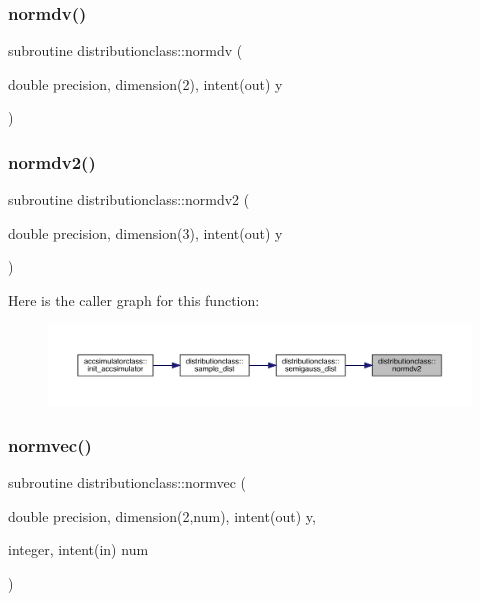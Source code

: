 \subsubsection{\texorpdfstring{normdv()}{normdv()}}
{\footnotesize\ttfamily subroutine distributionclass\+::normdv (\begin{DoxyParamCaption}\item[{double precision, dimension(2), intent(out)}]{y }\end{DoxyParamCaption})}

\mbox{\label{namespacedistributionclass_a020961b4717af242fc3c82090a17ce12}} 
\subsubsection{\texorpdfstring{normdv2()}{normdv2()}}
{\footnotesize\ttfamily subroutine distributionclass\+::normdv2 (\begin{DoxyParamCaption}\item[{double precision, dimension(3), intent(out)}]{y }\end{DoxyParamCaption})}

Here is the caller graph for this function\+:\nopagebreak
\begin{figure}[H]
\begin{center}
\leavevmode
\includegraphics[width=350pt]{namespacedistributionclass_a020961b4717af242fc3c82090a17ce12_icgraph}
\end{center}
\end{figure}
\mbox{\label{namespacedistributionclass_acfc04ca0c8be3e0f3e73779c5e88693b}} 
\subsubsection{\texorpdfstring{normvec()}{normvec()}}
{\footnotesize\ttfamily subroutine distributionclass\+::normvec (\begin{DoxyParamCaption}\item[{double precision, dimension(2,num), intent(out)}]{y,  }\item[{integer, intent(in)}]{num }\end{DoxyParamCaption})}

